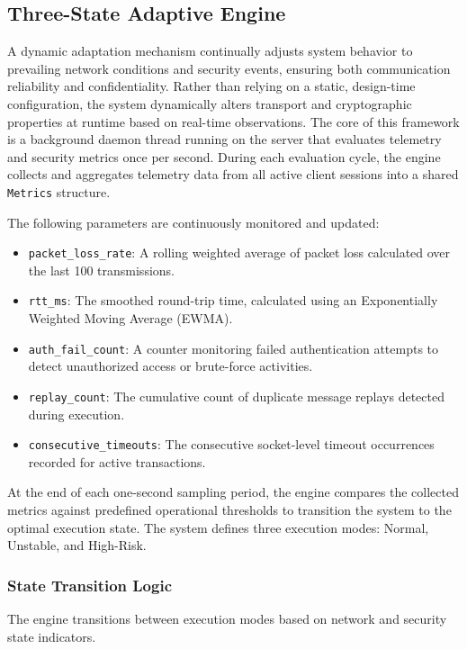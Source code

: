 \documentclass[conference]{IEEEtran}
\begin{document}
\subsection{Three-State Adaptive Engine}

A dynamic adaptation mechanism continually adjusts system behavior to prevailing network conditions and security events, ensuring both communication reliability and confidentiality. Rather than relying on a static, design-time configuration, the system dynamically alters transport and cryptographic properties at runtime based on real-time observations. The core of this framework is a background daemon thread running on the server that evaluates telemetry and security metrics once per second. During each evaluation cycle, the engine collects and aggregates telemetry data from all active client sessions into a shared \texttt{Metrics} structure.

The following parameters are continuously monitored and updated:
\begin{itemize}
    \item \texttt{packet\_loss\_rate}: A rolling weighted average of packet loss calculated over the last 100 transmissions.
    \item \texttt{rtt\_ms}: The smoothed round-trip time, calculated using an Exponentially Weighted Moving Average (EWMA).
    \item \texttt{auth\_fail\_count}: A counter monitoring failed authentication attempts to detect unauthorized access or brute-force activities.
    \item \texttt{replay\_count}: The cumulative count of duplicate message replays detected during execution.
    \item \texttt{consecutive\_timeouts}: The consecutive socket-level timeout occurrences recorded for active transactions.
\end{itemize}

At the end of each one-second sampling period, the engine compares the collected metrics against predefined operational thresholds to transition the system to the optimal execution state. The system defines three execution modes: Normal, Unstable, and High-Risk.

\subsubsection{State Transition Logic}
The engine transitions between execution modes based on network and security state indicators.
\end{document}
